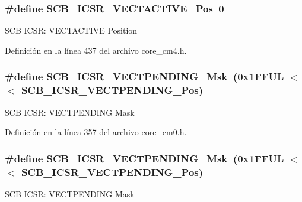 \subsubsection[{\texorpdfstring{S\+C\+B\+\_\+\+I\+C\+S\+R\+\_\+\+V\+E\+C\+T\+A\+C\+T\+I\+V\+E\+\_\+\+Pos}{SCB_ICSR_VECTACTIVE_Pos}}]{\setlength{\rightskip}{0pt plus 5cm}\#define S\+C\+B\+\_\+\+I\+C\+S\+R\+\_\+\+V\+E\+C\+T\+A\+C\+T\+I\+V\+E\+\_\+\+Pos~0}\hypertarget{group___c_m_s_i_s___s_c_b_gae4f602c7c5c895d5fb687b71b0979fc3}{}\label{group___c_m_s_i_s___s_c_b_gae4f602c7c5c895d5fb687b71b0979fc3}
S\+CB I\+C\+SR\+: V\+E\+C\+T\+A\+C\+T\+I\+VE Position 

Definición en la línea 437 del archivo core\+\_\+cm4.\+h.

\subsubsection[{\texorpdfstring{S\+C\+B\+\_\+\+I\+C\+S\+R\+\_\+\+V\+E\+C\+T\+P\+E\+N\+D\+I\+N\+G\+\_\+\+Msk}{SCB_ICSR_VECTPENDING_Msk}}]{\setlength{\rightskip}{0pt plus 5cm}\#define S\+C\+B\+\_\+\+I\+C\+S\+R\+\_\+\+V\+E\+C\+T\+P\+E\+N\+D\+I\+N\+G\+\_\+\+Msk~(0x1\+F\+F\+U\+L $<$$<$ S\+C\+B\+\_\+\+I\+C\+S\+R\+\_\+\+V\+E\+C\+T\+P\+E\+N\+D\+I\+N\+G\+\_\+\+Pos)}\hypertarget{group___c_m_s_i_s___s_c_b_gacb6992e7c7ddc27a370f62878a21ef72}{}\label{group___c_m_s_i_s___s_c_b_gacb6992e7c7ddc27a370f62878a21ef72}
S\+CB I\+C\+SR\+: V\+E\+C\+T\+P\+E\+N\+D\+I\+NG Mask 

Definición en la línea 357 del archivo core\+\_\+cm0.\+h.

\subsubsection[{\texorpdfstring{S\+C\+B\+\_\+\+I\+C\+S\+R\+\_\+\+V\+E\+C\+T\+P\+E\+N\+D\+I\+N\+G\+\_\+\+Msk}{SCB_ICSR_VECTPENDING_Msk}}]{\setlength{\rightskip}{0pt plus 5cm}\#define S\+C\+B\+\_\+\+I\+C\+S\+R\+\_\+\+V\+E\+C\+T\+P\+E\+N\+D\+I\+N\+G\+\_\+\+Msk~(0x1\+F\+F\+U\+L $<$$<$ S\+C\+B\+\_\+\+I\+C\+S\+R\+\_\+\+V\+E\+C\+T\+P\+E\+N\+D\+I\+N\+G\+\_\+\+Pos)}\hypertarget{group___c_m_s_i_s___s_c_b_gacb6992e7c7ddc27a370f62878a21ef72}{}\label{group___c_m_s_i_s___s_c_b_gacb6992e7c7ddc27a370f62878a21ef72}
S\+CB I\+C\+SR\+: V\+E\+C\+T\+P\+E\+N\+D\+I\+NG Mask 

